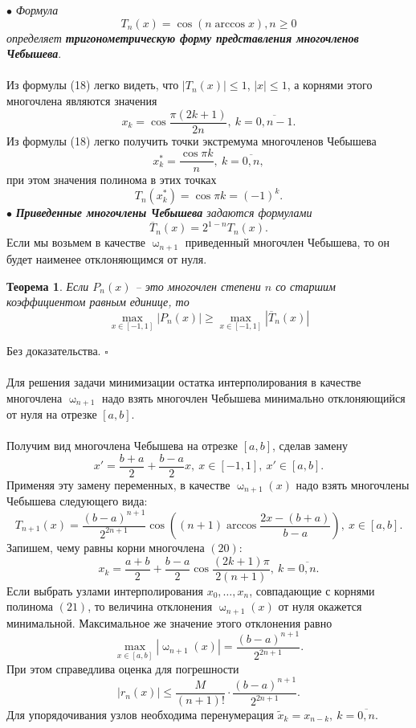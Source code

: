 \documentclass[a4paper, 12pt]{report}
\numberwithin{equation}{section}
\newenvironment{Proof} %
{\par\noindent{$\blacklozenge$}} %
{\hfill$\scriptstyle\square$}
\renewcommand{\leq}{\leqslant}
\renewcommand{\geq}{\geqslant}
\renewcommand{\omega}{\upomega}
\newtheorem*{theorem}{Теорема}
\begin{document}
	$\bullet$ \textit{Формула 
	\begin{equation}
		T_n(x) = \cos(n\arccos x), n\geq 0 
	\end{equation} определяет \textbf{тригонометрическую форму представления многочленов Чебышева}}.\\\\
	Из формулы (18) легко видеть, что $|T_n(x)|\leq 1$, $|x| \leq 1$, а корнями этого многочлена являются значения
	\begin{equation}
		x_k = \cos \dfrac{\pi (2k+1)}{2n},\ k =\overline{0,n-1}.
	\end{equation}
	Из формулы (18) легко получить точки экстремума многочленов Чебышева $$x_k^* = \dfrac{\cos \pi k}{n},\ k=\overline{0,n},$$
	при этом значения полинома в этих точках $$T_n(x_k^*) = \cos\pi k =(-1)^k.$$
	$\bullet$ \textit{\textbf{Приведенные многочлены Чебышева} задаются формулами} $$\overline T_n(x) = 2^{1-n}T_n(x).$$
	Если мы возьмем в качестве $\omega_{n+1}$ приведенный многочлен Чебышева, то он будет наименее отклоняющимся от нуля.
	\begin{theorem}
		Если $P_n(x)$ -- это многочлен степени $n$ со старшим коэффициентом равным единице, то $$\max_{x\in [-1,1]}|P_n(x)|\geq \max_{x\in [-1,1]} |\overline T_n(x)|$$
	\end{theorem}
	\begin{Proof}
		Без доказательства.
	\end{Proof}\\\\
	Для решения задачи минимизации остатка интерполирования в качестве многочлена $\omega_{n+1}$ надо взять многочлен Чебышева минимально отклоняющийся от нуля на отрезке $[a,b]$.\\\\ Получим вид многочлена Чебышева на отрезке $[a,b]$, сделав замену $$x' = \dfrac{b+a}{2} + \dfrac{b-a}{2}x,\ x \in [-1, 1],\ x' \in [a,b].$$
	Применяя эту замену переменных, в качестве $\omega_{n+1}(x)$ надо взять многочлены Чебышева следующего вида: 
	\begin{equation}
		T_{n+1}(x) = \dfrac{(b-a)^{n+1}}{2^{2n+1}} \cos\left((n+1)\arccos \dfrac{2x - (b+a)}{b-a}\right),\ x\in [a,b].
	\end{equation}
	Запишем, чему равны корни многочлена $(20)$:
	\begin{equation}
		x_k = \dfrac{a+b}{2} + \dfrac{b-a}{2}\cos \dfrac{(2k+1)\pi}{2(n+1)},\ k=\overline{0,n}.
	\end{equation}
	Если выбрать узлами интерполирования $x_0,\ldots, x_n$, совпадающие с корнями полинома $(21)$, то величина отклонения $\omega_{n+1}(x)$ от нуля окажется минимальной. Максимальное же значение этого отклонения равно $$\max_{x \in [a,b]} |\omega_{n+1}(x)|=\dfrac{(b-a)^{n+1}}{2^{2n+1}}.$$
	При этом справедлива оценка для погрешности \begin{equation}
		|r_n(x)| \leq \dfrac{M}{(n+1)!}\cdot \dfrac{(b-a)^{n+1}}{2^{2n+1}}.
	\end{equation}
	Для упорядочивания узлов необходима перенумерация $\widetilde{x}_k = x_{n-k},\ k=\overline{0,n}.$
\end{document}

